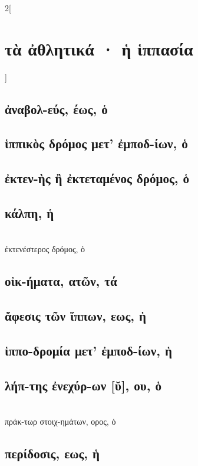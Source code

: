 \documentclass{book}
\begin{document}
\begin{multicols}{2}[\section{τὰ ἀθλητικά · ἡ ἱππασία}]
\subsection{ἀναβολ-εύς, έως, ὁ}
\subsection{ἱππικὸς δρόμος μετ' ἐμποδ-ίων, ὁ}
\subsection{ἐκτεν-ὴς ἢ ἐκτεταμένος δρόμος, ὁ}
\subsection{κάλπη, ἡ}
 ~\\
ἐκτενέστερος δρόμος, ὁ
\subsection{οἰκ-ήματα, ατῶν, τά}
\subsection{ἄφεσις τῶν ἵππων, εως, ἡ}
\subsection{ἱππο-δρομία μετ' ἐμποδ-ίων, ἡ}                
\subsection{λήπ-της ἐνεχύρ-ων [ῠ], ου, ὁ}
 ~\\
πράκ-τωρ στοιχ-ημάτων, ορος, ὁ
\subsection{περίδοσις, εως, ἡ}
~
\end{multicols}
\newpage  
\end{document}

